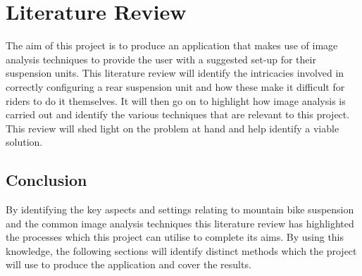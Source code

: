 \section{Literature Review}\label{sec:lit_review}
	\begin{comment}
	The purpose of this section is to introduce the concepts of mountain bike suspension setup and indicate why this may be difficult for a less knowledgeable individuals. It will then continue to identify and explain common image analysis techniques and how they may be applied to mountain bike suspension setup.
	\\\\
	The aim of this project is to produce an application which provides the user with a suggested suspension setup using image analysis. This literature review will cover the settings which the application may produce as well as 
	\end{comment}
	The aim of this project is to produce an application that makes use of image analysis techniques to provide the user with a suggested set-up for their suspension units. This literature review will identify the intricacies involved in correctly configuring a rear suspension unit and how these make it difficult for riders to do it themselves. It will then go on to highlight how image analysis is carried out and identify the various techniques that are relevant to this project. This review will shed light on the problem at hand and help identify a viable solution.
	
	
	
	
	
	
	\subsection{Conclusion}
	By identifying the key aspects and settings relating to mountain bike suspension and the common image analysis techniques this literature review has highlighted the processes which this project can utilise to complete its aims. By using this knowledge, the following sections will identify distinct methods which the project will use to produce the application and cover the results. 
	\clearpage